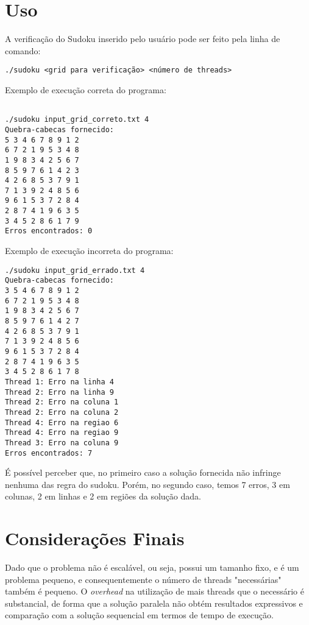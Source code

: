 \documentclass[a4paper, 12pt]{article}
\begin{document}
\section{Uso}

A verificação do Sudoku inserido pelo usuário pode ser feito pela linha de comando:
\begin{verbatim}
./sudoku <grid para verificação> <número de threads>
\end{verbatim}

Exemplo de execução correta do programa:

\begin{verbatim}

./sudoku input_grid_correto.txt 4
Quebra-cabecas fornecido:
5 3 4 6 7 8 9 1 2
6 7 2 1 9 5 3 4 8
1 9 8 3 4 2 5 6 7
8 5 9 7 6 1 4 2 3
4 2 6 8 5 3 7 9 1
7 1 3 9 2 4 8 5 6
9 6 1 5 3 7 2 8 4
2 8 7 4 1 9 6 3 5
3 4 5 2 8 6 1 7 9
Erros encontrados: 0
\end{verbatim}

Exemplo de execução incorreta do programa:

\begin{verbatim}
./sudoku input_grid_errado.txt 4
Quebra-cabecas fornecido:
3 5 4 6 7 8 9 1 2
6 7 2 1 9 5 3 4 8
1 9 8 3 4 2 5 6 7
8 5 9 7 6 1 4 2 7
4 2 6 8 5 3 7 9 1
7 1 3 9 2 4 8 5 6
9 6 1 5 3 7 2 8 4
2 8 7 4 1 9 6 3 5
3 4 5 2 8 6 1 7 8
Thread 1: Erro na linha 4
Thread 2: Erro na linha 9
Thread 2: Erro na coluna 1
Thread 2: Erro na coluna 2
Thread 4: Erro na regiao 6
Thread 4: Erro na regiao 9
Thread 3: Erro na coluna 9
Erros encontrados: 7
\end{verbatim}

É possível perceber que, no primeiro caso a solução fornecida não infringe
nenhuma das regra do sudoku. Porém, no segundo caso, temos 7 erros, 3 em
colunas, 2 em linhas e 2 em regiões da solução dada.

\section{Considerações Finais}
Dado que o problema não é escalável, ou seja, possui um tamanho fixo, e é um
problema pequeno, e consequentemente o número de threads "necessárias" também é
pequeno. O \textit{overhead} na utilização de mais threads que o necessário é
substancial, de forma que a solução paralela não obtém resultados expressivos
e comparação com a solução sequencial em termos de tempo de execução.
\end{document}
